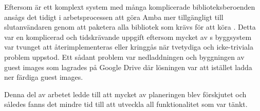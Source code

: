 Eftersom \stoe{} är ett komplext system med många komplicerade
biblioteksberoenden ansågs det tidigt i arbetsprocessen att göra Amba mer
tillgängligt till slutanvändaren genom att paketera alla bibliotek som krävs för
att köra \stoe{}. Detta var en komplicerad och tidskrävande uppgift eftersom
mycket av \stoe{}s byggsystem var tvunget att återimplementeras eller kringgås
när tvetydiga och icke-triviala problem uppstod. Ett sådant problem var
nedladdningen och byggningen av guest images som \stoe{} lagrades på Google
Drive där lösningen var att istället ladda ner färdiga guest images.

Denna del av arbetet ledde till att mycket av planeringen blev förskjutet och
således fanns det mindre tid till att utveckla all funktionalitet som var tänkt.
